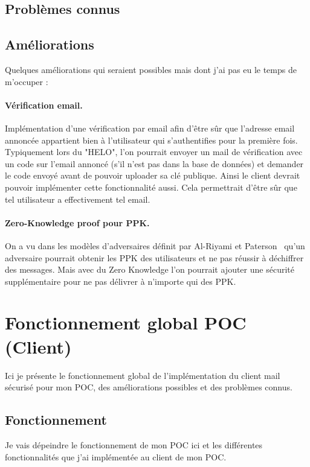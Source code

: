 \subsection{Problèmes connus}
\subsection{Améliorations}
Quelques améliorations qui seraient possibles mais dont j'ai pas eu le temps de m'occuper :
\paragraph*{Vérification email.}
Implémentation d'une vérification par email afin d'être sûr que l'adresse email annoncée appartient bien à l'utilisateur qui s'authentifies pour la première fois. Typiquement lors du "HELO", l'on pourrait envoyer un mail de vérification avec un code sur l'email annoncé (s'il n'est pas dans la base de données) et demander le code envoyé avant de pouvoir uploader sa clé publique. Ainsi le client devrait pouvoir implémenter cette fonctionnalité aussi. Cela permettrait d'être sûr que tel utilisateur a effectivement tel email.
\paragraph*{Zero-Knowledge proof pour PPK.}
On a vu dans les modèles d'adversaires définit par Al-Riyami et Paterson~\cite{DBLP:conf/asiacrypt/Al-RiyamiP03} qu'un adversaire pourrait obtenir les PPK des utilisateurs et ne pas réussir à déchiffrer des messages. Mais avec du Zero Knowledge l'on pourrait ajouter une sécurité supplémentaire pour ne pas délivrer à n'importe qui des PPK.
\section{Fonctionnement global POC (Client)}
Ici je présente le fonctionnement global de l'implémentation du client mail sécurisé pour mon POC, des améliorations possibles et des problèmes connus.
\subsection{Fonctionnement}
Je vais dépeindre le fonctionnement de mon POC ici et les différentes fonctionnalités que j'ai implémentée au client de mon POC.
